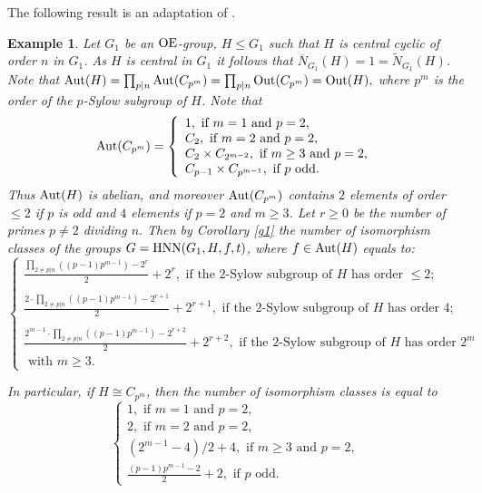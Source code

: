\documentclass[a4paper,12pt]{article}
\def\OE{{\rm OE}}
\def\aut {{\rm Aut}}
\def\out {{\rm Out}}
\def\hnn {{\rm HNN}}
\newtheorem{exa}[thm]{Example}
\begin{document}
{The following result is an adaptation of \cite[Example 4.8]{ BZ}.


\begin{exa}\label{bb}
Let $G_1$ be an $\OE$-group, $H\leq G_1$ such that $H$ is central cyclic of order $n$ in $G_1$. As $H$ is central in $G_1$ it follows that $\overline{N}_{G_1}(H)=1=\widetilde{N}_{G_1}(H)$. Note that 
$\aut(H)=\prod_{p| n} \aut(C_{p^m})=\prod_{p| n} \out(C_{p^m})=\out(H),$   where $p^m$ is the order of the $p$-Sylow subgroup of $H$. 
Note that
$$\aut(C_{p^m})=\left\{\begin{array}{l}
1, \mbox{  if } m=1 \mbox{ and } p=2,\\
C_{2}, \mbox{  if } m=2 \mbox{ and } p=2,\\
C_{2}\times C_{2^{m-2}}, \mbox{  if } m\geq3\mbox{ and } p=2,\\
C_{p-1}\times C_{p^{m-1}}, \mbox{  if } p \mbox{ odd.}
\end{array} \right.$$
Thus $\aut(H)$ is abelian, and moreover  $\aut(C_{p^m})$ contains $2$ elements of order $\leq 2$ if $p$ is odd and $4$ elements if  $p=2$ and $m\geq3$. Let $r \geq 0$ be the number of primes $p \neq 2$ dividing $n.$ Then by Corollary \ref{g1}  the number of isomorphism classes of the groups $G=\hnn(G_1, H, f, t)$, where $f \in \aut(H)$ equals to:
$$\left\{\begin{array}{l} 

\frac{\prod_{2\neq p|n} \left( (p-1)p^{m-1}\right) -2^r}{2} +2^r, \mbox{ if the 2-Sylow subgroup of } H \mbox { has order } \leq 2;\\
\\

\frac{2 \cdot  \prod_{2\neq p|n} \left( (p-1)p^{m-1}\right) -2^{r+1}}{2} +2^{r+1}, \mbox{ if the 2-Sylow subgroup of } H \mbox{ has  order } 4;\\
\\
\frac{2^{m-1} \cdot  \prod_{2\neq p|n} \left( (p-1)p^{m-1}\right) -2^{r+2}}{2} +2^{r+2}, \mbox{ if the 2-Sylow subgroup of } H \mbox{ has order } 2^m \\ \mbox{ with } m\geq 3.
\end{array} \right.$$

In particular, if $H\cong C_{p^m}$, then the number of isomorphism classes is equal to 
$$\left\{\begin{array}{l}
1, \mbox{  if } m=1 \mbox{ and } p=2,\\
2, \mbox{  if } m=2 \mbox{ and } p=2,\\
(2^{m-1}-4)/2 +4, \mbox{  if  }m\geq3 \mbox{ and } p=2, \\
\frac{(p-1)p^{m-1}-2}{2} +2,\mbox{ if } p \mbox{ odd}.
\end{array} \right.$$
\end{exa}

}
\end{document}
